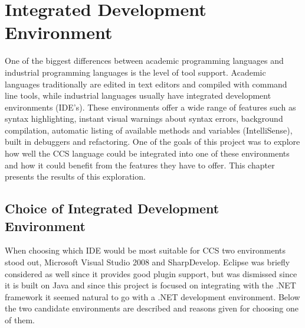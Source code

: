 \chapter{Integrated Development Environment}\label{ch:ide}

	One of the biggest differences between academic programming languages and 
	industrial programming languages is the level of tool support. Academic 
	languages traditionally are edited in text editors and compiled with command 
	line tools, while industrial languages usually have integrated development 
	environments (IDE's). These environments offer a wide range of features such 
	as syntax highlighting, instant visual warnings about syntax errors, 
	background compilation, automatic listing of available methods and variables 
	(IntelliSense), built in debuggers and refactoring. One of the goals of this 
	project was to explore how well the CCS language could be integrated into 
	one of these environments and how it could benefit from the features they 
	have to offer. This chapter presents the results of this exploration. 
	
\section{Choice of Integrated Development Environment}
	
	When choosing which IDE would be most suitable for CCS two environments 
	stood out, Microsoft Visual Studio 2008 and SharpDevelop. Eclipse 
	was briefly considered as well since it provides good plugin support, but 
	was dismissed since it is built on Java and since this project is focused on 
	integrating with the .NET framework it seemed natural to go with a .NET 
	development environment. Below the two candidate environments are described 
	and reasons given for choosing one of them.
	
